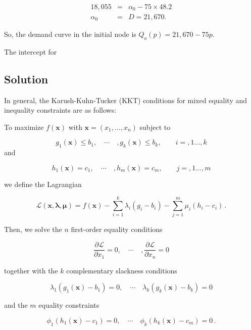 \begin{eqnarray*}
  18,055 &=& \alpha_0-75\times 48.2\\
  \alpha_0 &=&D=21,670.
\end{eqnarray*}

So, the demand curve in the initial node is $Q_o(p) = 21,670-75p$.

The intercept for 


\subsection{Solution}
\label{sec:solution}

In general, the Karush-Kuhn-Tucker (KKT) conditions for mixed equality and inequality constraints are as follows:

To maximize $f(\bm{x})$ with $\bm{x}=(x_1,\dots, x_n)$ subject to

\begin{equation*}
  g_1(\bm{x})\leq b_1, \quad\cdots\quad, g_k(\bm{x})\leq b_k,\qquad i=,1\dots, k
\end{equation*}
and

\begin{equation*}
  h_1(\bm{x})= c_1, \quad\cdots\quad, h_m(\bm{x})= c_m,\qquad j=,1\dots, m
\end{equation*}

we define the Lagrangian

\begin{equation*}
    \mathcal{L}(\bm{x,\lambda,\mu})=f(\bm{x})-\sum_{i=1}^k\lambda_i(g_i-b_i)-\sum_{j=1}^m\mu_i(h_i-c_i)\,.
\end{equation*}

Then, we solve the $n$ first-order equality conditions

\begin{equation*}
  \frac{\partial\mathcal{L}}{\partial x_1}=0, \quad\cdots\quad,  \frac{\partial\mathcal{L}}{\partial x_n}=0
\end{equation*}

together with the $k$ complementary slackness conditions

\begin{equation*}
  \lambda_1(g_1(\bm{x})-b_1)=0,\quad\cdots\quad\lambda_k(g_k(\bm{x})-b_k)=0
\end{equation*}

and the $m$ equality constraints

\begin{equation*}
  \phi_1(h_1(\bm{x})-c_1)=0,\quad\cdots\quad\phi_k(h_k(\bm{x})-c_m)=0\,.
\end{equation*}

